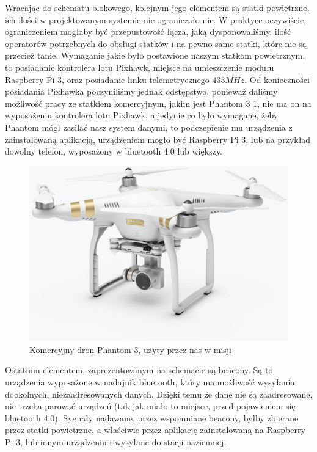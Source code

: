 Wracając do schematu blokowego, kolejnym jego elementem są statki powietrzne, ich ilości w projektowanym systemie nie ograniczało nic. W praktyce oczywiście, ograniczeniem mogłaby być przepustowość łącza, jaką dysponowaliśmy, ilość operatorów potrzebnych do obsługi statków i na pewno same statki, które nie są przecież tanie. Wymaganie jakie było postawione naszym statkom powietrznym, to posiadanie kontrolera lotu Pixhawk, miejsce na umieszczenie modułu Raspberry Pi 3, oraz posiadanie linku telemetrycznego $433 MHz$. Od konieczności posiadania Pixhawka poczyniliśmy jednak odstępstwo, ponieważ daliśmy możliwość pracy ze statkiem komercyjnym, jakim jest Phantom 3 \ref{fig:phantom}, nie ma on na wyposażeniu kontrolera lotu Pixhawk, a jedynie co było wymagane, żeby Phantom mógł zasilać nasz system danymi, to podczepienie mu urządzenia z zainstalowaną aplikacją, urządzeniem mogło być Raspberry Pi 3, lub na przykład dowolny telefon, wyposażony w bluetooth 4.0 lub większy.

\begin{figure}[!th]
    \centering
    \includegraphics[width=15cm]{zalaczniki/obrazy/phantom3.jpg}
	\caption{Komercyjny dron Phantom 3, użyty przez nas w misji}
    \label{fig:phantom}
\end{figure}

Ostatnim elementem, zaprezentowanym na schemacie są beacony. Są to urządzenia wyposażone w nadajnik bluetooth, który ma możliwość wysyłania dookolnych, niezaadresowanych danych. Dzięki temu że dane nie są zaadresowane, nie trzeba parować urządzeń (tak jak miało to miejsce, przed pojawieniem się bluetooth 4.0). Sygnały nadawane, przez wspomniane beacony, byłby zbierane przez statki powietrzne, a właściwie przez aplikację zainstalowaną na Raspberry Pi 3, lub innym urządzeniu i wysyłane do stacji naziemnej.

